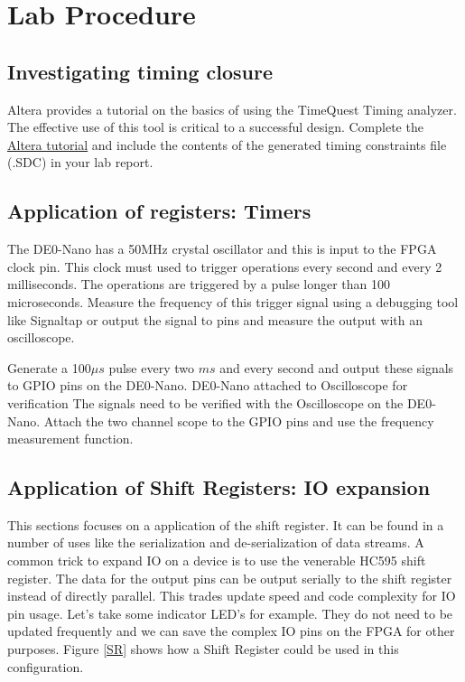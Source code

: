 \section{Lab Procedure}
    \subsection{Investigating timing closure}
     Altera provides a tutorial on the basics of using the TimeQuest Timing analyzer. The effective use of this tool is critical to a successful design. Complete the \href{ftp://ftp.altera.com/up/pub/Altera_Material/13.0/Tutorials/Timequest.pdf}{Altera tutorial} and include the contents of the generated timing constraints file (.SDC) in your lab report.

    \subsection{Application of registers: Timers}
    The DE0-Nano has a 50MHz crystal oscillator and this is input to the FPGA clock pin.  This clock must used to trigger operations every second and every 2 milliseconds. The operations are triggered by a pulse longer than 100 microseconds. Measure the frequency  of this trigger signal using a debugging tool like Signaltap or output the signal to pins and measure the output with an oscilloscope.
     
      {Generate a 100$\mu s$ pulse every two $ms$ and every second and output these signals to GPIO pins on the DE0-Nano.}
      {DE0-Nano attached to Oscilloscope for verification}
      {The signals need to be verified with the Oscilloscope on the DE0-Nano. Attach the two channel scope to the GPIO pins and use the frequency measurement function.}

    \subsection{Application of Shift Registers: IO expansion}
    This sections focuses on a application of the shift register. It can be found in a number of uses like the serialization and de-serialization of data streams. A common trick to expand IO on a device is to use the venerable HC595 shift register. The data for the output pins can be output serially to the shift register instead of directly parallel. This trades update speed and code complexity for IO pin usage. Let's take some indicator LED's for example. They do not need to be updated frequently and we can save the complex IO pins on the FPGA for other purposes.  Figure \ref{SR} shows how a Shift Register could be used in this configuration.

